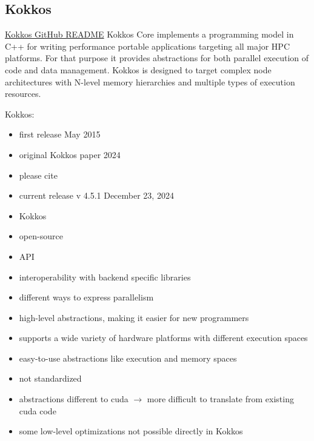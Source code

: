\newpage
\subsection{Kokkos}
\label{sec:frameworks:kokkos}

\begin{quotebox}{\href{https://github.com/kokkos/kokkos}{Kokkos GitHub README}}
    Kokkos Core implements a programming model in C++ for writing performance portable applications targeting all major HPC platforms. For that purpose it provides abstractions for both parallel execution of code and data management. Kokkos is designed to target complex node architectures with N-level memory hierarchies and multiple types of execution resources.
\end{quotebox}

Kokkos:
\begin{itemize}
    \item first release May 2015~\cite{trott_kokkos_2015}
    \item original Kokkos paper 2024~\cite{carter_edwards_kokkos_2014}
    \item please cite~\cite{trott_kokkos_2022}
    \item current release v 4.5.1 December 23, 2024~\cite{noauthor_release_2024}
\end{itemize}

\begin{itemize}
    \item Kokkos
    \item open-source
    \item \cpp API
    \item interoperability with backend specific libraries
    \item different ways to express parallelism
    \item high-level abstractions, making it easier for new programmers
\end{itemize}


\begin{advantagebox}
    \begin{itemize}
        \item supports a wide variety of hardware platforms with different execution spaces
        \item easy-to-use abstractions like execution and memory spaces
    \end{itemize}
\end{advantagebox}

\begin{disadvantagebox}
    \begin{itemize}
        \item not standardized
        \item abstractions different to \gls{cuda} $\rightarrow$ more difficult to translate from existing \gls{cuda} code
        \item some low-level optimizations not possible directly in Kokkos
    \end{itemize}
\end{disadvantagebox}

